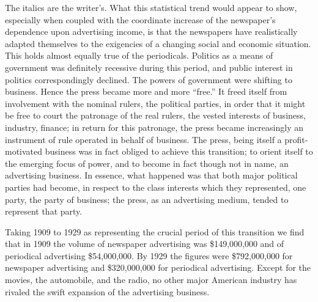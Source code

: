\documentclass[nohyper,openany,nobib]{tufte-book}
\begin{document}
The italics are the writer's. What this statistical trend would appear
to show, especially when coupled with the coordinate increase of the
newspaper's dependence upon advertising income, is that the newspapers
have realistically adapted themselves to the exigencies of a changing
social and economic situation. This holds almost equally true of the
periodicals. Politics as a means of government was definitely recessive
during this period, and public interest in politics correspondingly
declined. The powers of government were shifting to business. Hence the
press became more and more ``free.'' It freed itself from involvement
with the nominal rulers, the political parties, in order that it might
be free to court the patronage of the real rulers, the vested interests
of business, industry, finance; in return for this patronage, the press
became increasingly an instrument of rule operated in behalf of
business. The press, being itself a profit-motivated business was in
fact obliged to achieve this transition; to orient itself to the
emerging focus of power, and to become in fact though not in name, an
advertising business. In essence, what happened was that both major
political parties had become, in respect to the class interests which
they represented, one party, the party of business; the press, as an
advertising medium, tended to represent that party.

Taking 1909 to 1929 as representing the crucial period of this
transition we find that in 1909 the volume of newspaper advertising was
\$149,000,000 and of periodical advertising \$54,000,000. By 1929 the
figures were \$792,000,000 for newspaper advertising and \$320,000,000
for periodical advertising. Except for the movies, the automobile, and
the radio, no other major American industry has rivaled the swift
expansion of the advertising business.
\end{document}
